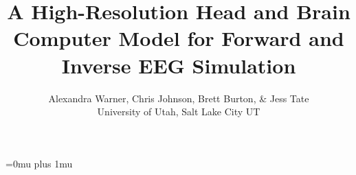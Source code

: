 \documentclass[11pt]{article}
\begin{document}
\title{A High-Resolution Head and Brain Computer Model for Forward and Inverse EEG Simulation}
\author{Alexandra Warner, Chris Johnson, Brett Burton, \& Jess Tate \\
University of Utah, Salt Lake City UT}
\maketitle

%
%






\Urlmuskip=0mu plus 1mu\relax




\end{document}
